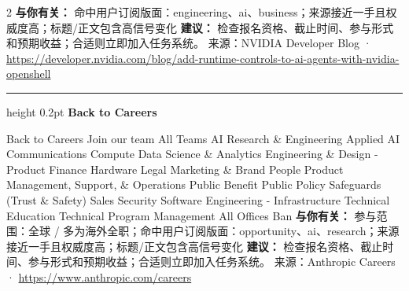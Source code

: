 \documentclass[10.5pt]{ctexart}
\begin{document}
\begin{multicols}{2}
\textbf{与你有关：} 命中用户订阅版面：engineering、ai、business；来源接近一手且权威度高；标题/正文包含高信号变化
\textbf{建议：} 检查报名资格、截止时间、参与形式和预期收益；合适则立即加入任务系统。
{\footnotesize\color{ormuted} 来源：NVIDIA Developer Blog · \url{https://developer.nvidia.com/blog/add-runtime-controls-to-ai-agents-with-nvidia-openshell}}
\vspace{2mm}
\hrule height 0.2pt
\vspace{2mm}
{\large\bfseries Back to Careers}\par
Back to Careers Join our team All Teams AI Research \& Engineering Applied AI Communications Compute Data Science \& Analytics Engineering \& Design - Product Finance Hardware Legal Marketing \& Brand People Product Management, Support, \& Operations Public Benefit Public Policy Safeguards (Trust \& Safety) Sales Security Software Engineering - Infrastructure Technical Education Technical Program Management All Offices Ban
\textbf{与你有关：} 参与范围：全球 / 多为海外全职；命中用户订阅版面：opportunity、ai、research；来源接近一手且权威度高；标题/正文包含高信号变化
\textbf{建议：} 检查报名资格、截止时间、参与形式和预期收益；合适则立即加入任务系统。
{\footnotesize\color{ormuted} 来源：Anthropic Careers · \url{https://www.anthropic.com/careers}}
\end{multicols}
\end{document}
